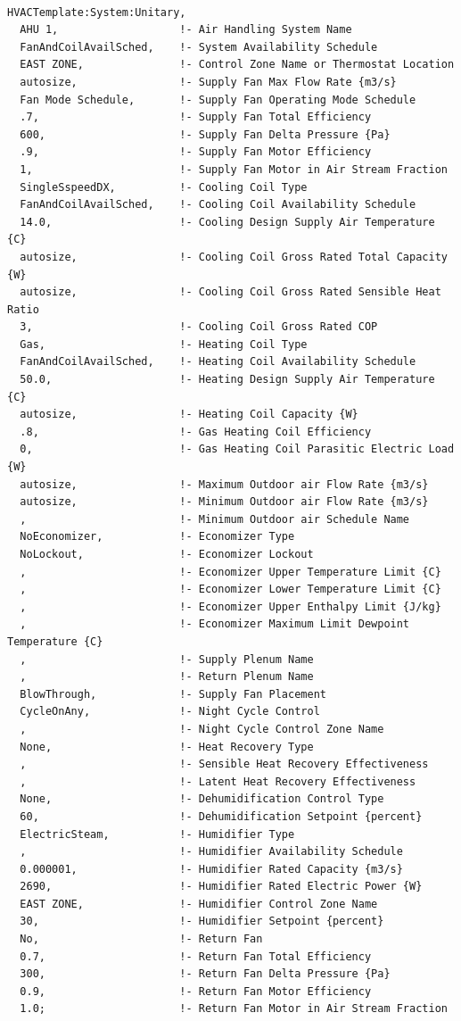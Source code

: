 \begin{lstlisting}

HVACTemplate:System:Unitary,
  AHU 1,                   !- Air Handling System Name
  FanAndCoilAvailSched,    !- System Availability Schedule
  EAST ZONE,               !- Control Zone Name or Thermostat Location
  autosize,                !- Supply Fan Max Flow Rate {m3/s}
  Fan Mode Schedule,       !- Supply Fan Operating Mode Schedule
  .7,                      !- Supply Fan Total Efficiency
  600,                     !- Supply Fan Delta Pressure {Pa}
  .9,                      !- Supply Fan Motor Efficiency
  1,                       !- Supply Fan Motor in Air Stream Fraction
  SingleSspeedDX,          !- Cooling Coil Type
  FanAndCoilAvailSched,    !- Cooling Coil Availability Schedule
  14.0,                    !- Cooling Design Supply Air Temperature {C}
  autosize,                !- Cooling Coil Gross Rated Total Capacity {W}
  autosize,                !- Cooling Coil Gross Rated Sensible Heat Ratio
  3,                       !- Cooling Coil Gross Rated COP
  Gas,                     !- Heating Coil Type
  FanAndCoilAvailSched,    !- Heating Coil Availability Schedule
  50.0,                    !- Heating Design Supply Air Temperature {C}
  autosize,                !- Heating Coil Capacity {W}
  .8,                      !- Gas Heating Coil Efficiency
  0,                       !- Gas Heating Coil Parasitic Electric Load {W}
  autosize,                !- Maximum Outdoor air Flow Rate {m3/s}
  autosize,                !- Minimum Outdoor air Flow Rate {m3/s}
  ,                        !- Minimum Outdoor air Schedule Name
  NoEconomizer,            !- Economizer Type
  NoLockout,               !- Economizer Lockout
  ,                        !- Economizer Upper Temperature Limit {C}
  ,                        !- Economizer Lower Temperature Limit {C}
  ,                        !- Economizer Upper Enthalpy Limit {J/kg}
  ,                        !- Economizer Maximum Limit Dewpoint Temperature {C}
  ,                        !- Supply Plenum Name
  ,                        !- Return Plenum Name
  BlowThrough,             !- Supply Fan Placement
  CycleOnAny,              !- Night Cycle Control
  ,                        !- Night Cycle Control Zone Name
  None,                    !- Heat Recovery Type
  ,                        !- Sensible Heat Recovery Effectiveness
  ,                        !- Latent Heat Recovery Effectiveness
  None,                    !- Dehumidification Control Type
  60,                      !- Dehumidification Setpoint {percent}
  ElectricSteam,           !- Humidifier Type
  ,                        !- Humidifier Availability Schedule
  0.000001,                !- Humidifier Rated Capacity {m3/s}
  2690,                    !- Humidifier Rated Electric Power {W}
  EAST ZONE,               !- Humidifier Control Zone Name
  30,                      !- Humidifier Setpoint {percent}
  No,                      !- Return Fan
  0.7,                     !- Return Fan Total Efficiency
  300,                     !- Return Fan Delta Pressure {Pa}
  0.9,                     !- Return Fan Motor Efficiency
  1.0;                     !- Return Fan Motor in Air Stream Fraction
\end{lstlisting}

